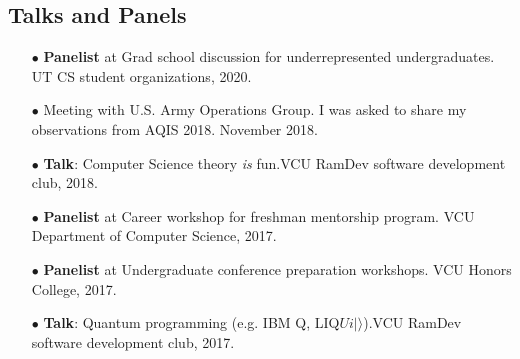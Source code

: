 \documentclass[11pt,letterpaper,serif]{moderncv}
\begin{document}
\smallskip
\subsection{Talks and Panels}

\begin{itemize}
	\item[$\bullet$] \textbf{Panelist} at Grad school discussion for underrepresented undergraduates. UT CS student organizations, 2020.
	\item[$\bullet$] Meeting with U.S. Army Operations Group. I was asked to share my observations from AQIS 2018. November 2018.
	\item[$\bullet$] \textbf{Talk}: Computer Science theory \emph{is} fun.\quad VCU RamDev software development club, 2018.
	\item[$\bullet$] \textbf{Panelist} at Career workshop for freshman mentorship program. VCU Department of Computer Science, 2017.
	\item[$\bullet$] \textbf{Panelist} at Undergraduate conference preparation workshops. VCU Honors College, 2017.
	\item[$\bullet$] \textbf{Talk}: Quantum programming (e.g. IBM Q, LIQ$Ui|\rangle$).\quad VCU RamDev software development club, 2017.
\end{itemize}
\end{document}
